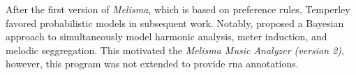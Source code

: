After the first version of \emph{Melisma}, which is based on
preference rules, Temperley favored probabilistic models in
subsequent work. Notably, \textcite{temperley2009unified}
proposed a Bayesian approach to simultaneously model
harmonic analysis, meter induction, and melodic
seggregation. This motivated the \emph{Melisma Music
Analyzer (version
2)},
however, this program was not extended to provide \gls{rna}
annotations.




